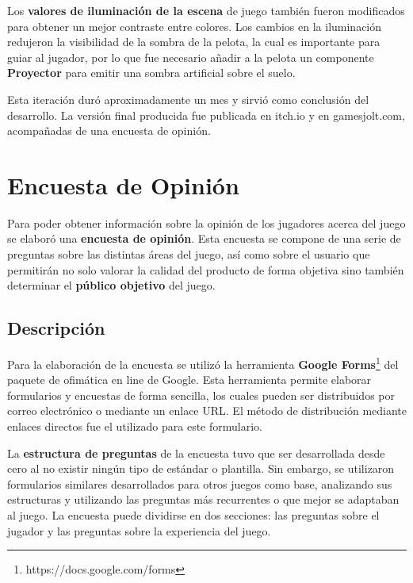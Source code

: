 Los \textbf{valores de iluminación de la escena} de juego también fueron modificados para obtener un mejor contraste entre colores. Los cambios en la iluminación redujeron la visibilidad de la sombra de la pelota, la cual es importante para guiar al jugador, por lo que fue necesario añadir a la pelota un componente \textbf{Proyector} para emitir una sombra artificial sobre el suelo.

Esta iteración duró aproximadamente un mes y sirvió como conclusión del desarrollo. La versión final producida fue publicada en itch.io y en gamesjolt.com, acompañadas de una encuesta de opinión.

\section{Encuesta de Opinión}
Para poder obtener información sobre la opinión de los jugadores acerca del juego se elaboró una \textbf{encuesta de opinión}. Esta encuesta se compone de una serie de preguntas sobre las distintas áreas del juego, así como sobre el usuario que permitirán no solo valorar la calidad del producto de forma objetiva sino también determinar el \textbf{público objetivo} del juego.

\subsection{Descripción}
Para la elaboración de la encuesta se utilizó la herramienta \textbf{Google Forms}\footnote{https://docs.google.com/forms} del paquete de ofimática en line de Google. Esta herramienta permite elaborar formularios y encuestas de forma sencilla, los cuales pueden ser distribuidos por correo electrónico o mediante un enlace URL. El método de distribución mediante enlaces directos fue el utilizado para este formulario.

La \textbf{estructura de preguntas} de la encuesta tuvo que ser desarrollada desde cero al no existir ningún tipo de estándar o plantilla. Sin embargo, se utilizaron formularios similares desarrollados para otros juegos  como base, analizando sus estructuras y utilizando las preguntas más recurrentes o que mejor se adaptaban al juego. La encuesta puede dividirse en dos secciones: las preguntas sobre el jugador y las preguntas sobre la experiencia del juego.


